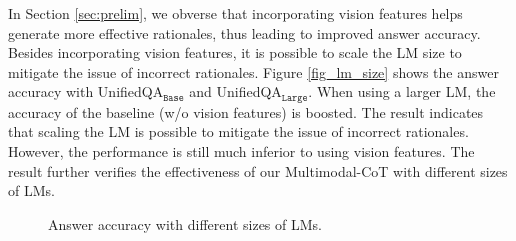 \documentclass[nohyperref]{article}
\theoremstyle{plain}
\theoremstyle{definition}
\theoremstyle{remark}
\begin{document}
In Section \ref{sec:prelim}, we obverse that incorporating vision features helps generate more effective rationales, thus leading to improved answer accuracy. Besides incorporating vision features, it is possible to scale the LM size to mitigate the issue of incorrect rationales. Figure \ref{fig_lm_size} shows the answer accuracy with UnifiedQA$_\texttt{Base}$ and UnifiedQA$_\texttt{Large}$. When using a larger LM, the accuracy of the baseline (w/o vision features) is boosted. The result indicates that scaling the LM is possible to mitigate the issue of incorrect rationales. However, the performance is still much inferior to using vision features. The result further verifies the effectiveness of our Multimodal-CoT with different sizes of LMs.




\begin{figure}[htb]
  \begin{center}
{
\pgfplotsset{width=7.0cm, height=5.5cm}
    \centering


\caption{
   Answer accuracy with different sizes of LMs.\label{fig_lm_size}
    }
}
  \end{center}
  \label{fig_scaling}
\end{figure} 
\end{document}

